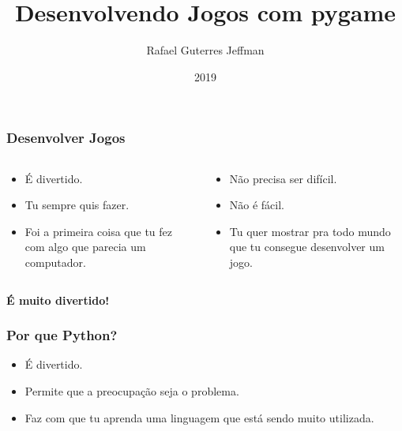 



\title{Desenvolvendo Jogos com pygame}
\subtitle{}
\author{Rafael Guterres Jeffman}
\institute{}
\date{2019}



\coverframe


\begin{frame}
    \frametitle{Desenvolver Jogos}

    \begin{columns}
        \begin{column}{0.5\textwidth}
            \begin{itemize}
                \item É divertido.
                \item Tu sempre quis fazer.
                \item Foi a primeira coisa que tu fez com algo que parecia
                um computador.
            \end{itemize}
        \end{column}
        \begin{column}{0.5\textwidth}
            \begin{itemize}
                \item Não precisa ser difícil.
                \item Não é fácil.
                \item Tu quer mostrar pra todo mundo que tu consegue
                desenvolver um jogo.
            \end{itemize}
        \end{column}
    \end{columns}
    \begin{center}
        \item {\Large \textbf{É muito divertido!}}
    \end{center}
\end{frame}


\begin{frame}
    \frametitle{Por que Python?}

    \begin{itemize}
        \item É divertido.
        \item Permite que a preocupação seja o problema.
        \item Faz com que tu aprenda uma linguagem que está sendo muito
        utilizada.
    \end{itemize}
\end{frame}


